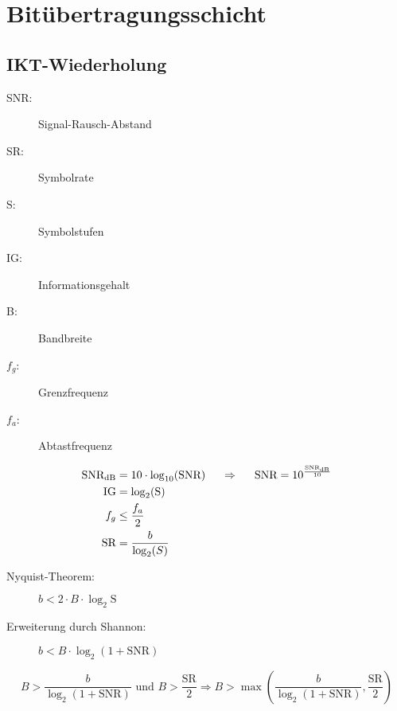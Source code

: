 \documentclass[a4paper]{article}
\begin{document}
\section{Bitübertragungsschicht}
\subsection{IKT-Wiederholung}
\begin{minipage}[t]{0.5\textwidth}
    \begin{description}
        \item[SNR:] Signal-Rausch-Abstand
        \item[SR:] Symbolrate
        \item[S:] Symbolstufen
        \item[IG:] Informationsgehalt
    \end{description}
\end{minipage}
\begin{minipage}[t]{0.5\textwidth}
    \begin{description}
        \item[B:] Bandbreite
        \item[$f_g$:] Grenzfrequenz
        \item[$f_a$:] Abtastfrequenz
    \end{description}
\end{minipage}

\begin{align*}
    \text{SNR}_{\text{dB}} &= 10 \cdot \log_{10}(\text{SNR}) \hspace{5mm} \Rightarrow \hspace{5mm} \text{SNR} = 10^{\frac{\text{SNR}_{\text{dB}}}{10}}\\
    \text{IG} &= \log_2(\text{S})\\
    f_g &\leq \frac{f_a}{2}\\
    \text{SR} &= \frac{b}{\log_2(S)}
\end{align*}
\begin{description}
    \item[Nyquist-Theorem:] $b < 2\cdot B \cdot \log_2{\text{S}}$
    \item[Erweiterung durch Shannon:] $b < B \cdot \log_2(1 + \text{SNR})$
\end{description}
\[
    B > \frac{b}{\log_2(1+\text{SNR})} \text{ und } B > \frac{\text{SR}}{2} \Rightarrow B > \max(\frac{b}{\log_2(1+\text{SNR})}, \frac{\text{SR}}{2})
\]
\end{document}
